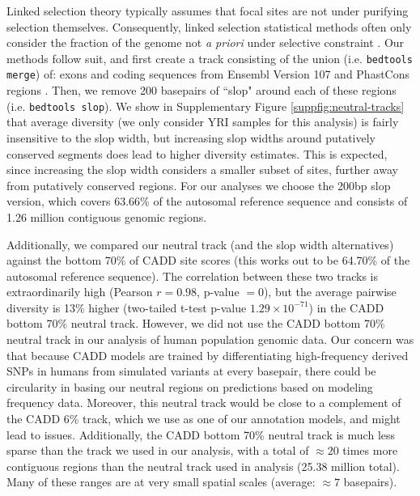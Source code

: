 \documentclass[11pt]{article}
\begin{document}
Linked selection theory typically assumes that focal sites are not under
purifying selection themselves. Consequently, linked selection statistical
methods often only consider the fraction of the genome not \emph{a priori}
under selective constraint \parencite[e.g. Appendix Section
3.1]{Murphy2022-sj}. Our methods follow suit, and first create a track
consisting of the union (i.e. \texttt{bedtools merge}) of: exons and coding
sequences from Ensembl Version 107
\parencite[]{Cunningham2022-vk} and
PhastCons regions
\parencite[]{Siepel2005-wh}. Then, we
remove 200 basepairs of ``slop" around each of these regions (i.e.
\texttt{bedtools slop}). We show in Supplementary Figure
\ref{suppfig:neutral-tracks} that average diversity (we only consider YRI
samples for this analysis) is fairly insensitive to the slop width, but
increasing slop widths around putatively conserved segments does lead to higher
diversity estimates. This is expected, since increasing the slop width
considers a smaller subset of sites, further away from putatively conserved
regions. For our analyses we choose the 200bp slop version, which covers
63.66\% of the autosomal reference sequence and consists of 1.26 million
contiguous genomic regions.

Additionally, we compared our neutral track (and the slop width alternatives)
against the bottom 70\% of CADD site scores (this works out to be 64.70\% of
the autosomal reference sequence). The correlation between these two tracks is
extraordinarily high (Pearson $r = 0.98$, p-value $=0$), but the average
pairwise diversity is 13\% higher (two-tailed t-test p-value $1.29 \times
10^{-71}$) in the CADD bottom 70\% neutral track. However, we did not use the
CADD bottom 70\%  neutral track in our analysis of human population genomic
data. Our concern was that because CADD models are trained by differentiating
high-frequency derived SNPs in humans from simulated variants at every
basepair, there could be circularity in basing our neutral regions on
predictions based on modeling frequency data. Moreover, this neutral track
would be close to a complement of the CADD 6\% track, which we use as one of
our annotation models, and might lead to issues. Additionally, the CADD bottom
70\% neutral track is much less sparse than the track we used in our analysis,
with a total of $\approx 20$ times more contiguous regions than the neutral
track used in analysis (25.38 million total). Many of these ranges are at very
small spatial scales (average: $\approx 7$ basepairs).
\end{document}
